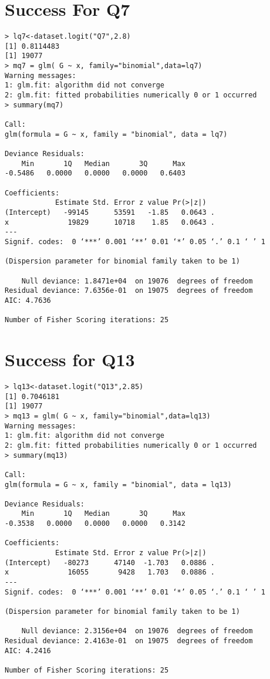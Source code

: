 \documentclass{amsart}
\begin{document}
\section{Success For Q7}

\begin{verbatim}
> lq7<-dataset.logit("Q7",2.8)
[1] 0.8114483
[1] 19077
> mq7 = glm( G ~ x, family="binomial",data=lq7)
Warning messages:
1: glm.fit: algorithm did not converge 
2: glm.fit: fitted probabilities numerically 0 or 1 occurred 
> summary(mq7)

Call:
glm(formula = G ~ x, family = "binomial", data = lq7)

Deviance Residuals: 
    Min       1Q   Median       3Q      Max  
-0.5486   0.0000   0.0000   0.0000   0.6403  

Coefficients:
            Estimate Std. Error z value Pr(>|z|)  
(Intercept)   -99145      53591   -1.85   0.0643 .
x              19829      10718    1.85   0.0643 .
---
Signif. codes:  0 ‘***’ 0.001 ‘**’ 0.01 ‘*’ 0.05 ‘.’ 0.1 ‘ ’ 1

(Dispersion parameter for binomial family taken to be 1)

    Null deviance: 1.8471e+04  on 19076  degrees of freedom
Residual deviance: 7.6356e-01  on 19075  degrees of freedom
AIC: 4.7636

Number of Fisher Scoring iterations: 25
\end{verbatim}

\section{Success for Q13}

\begin{verbatim}
> lq13<-dataset.logit("Q13",2.85)
[1] 0.7046181
[1] 19077
> mq13 = glm( G ~ x, family="binomial",data=lq13)
Warning messages:
1: glm.fit: algorithm did not converge 
2: glm.fit: fitted probabilities numerically 0 or 1 occurred 
> summary(mq13)

Call:
glm(formula = G ~ x, family = "binomial", data = lq13)

Deviance Residuals: 
    Min       1Q   Median       3Q      Max  
-0.3538   0.0000   0.0000   0.0000   0.3142  

Coefficients:
            Estimate Std. Error z value Pr(>|z|)  
(Intercept)   -80273      47140  -1.703   0.0886 .
x              16055       9428   1.703   0.0886 .
---
Signif. codes:  0 ‘***’ 0.001 ‘**’ 0.01 ‘*’ 0.05 ‘.’ 0.1 ‘ ’ 1

(Dispersion parameter for binomial family taken to be 1)

    Null deviance: 2.3156e+04  on 19076  degrees of freedom
Residual deviance: 2.4163e-01  on 19075  degrees of freedom
AIC: 4.2416

Number of Fisher Scoring iterations: 25
\end{verbatim}
\end{document}
